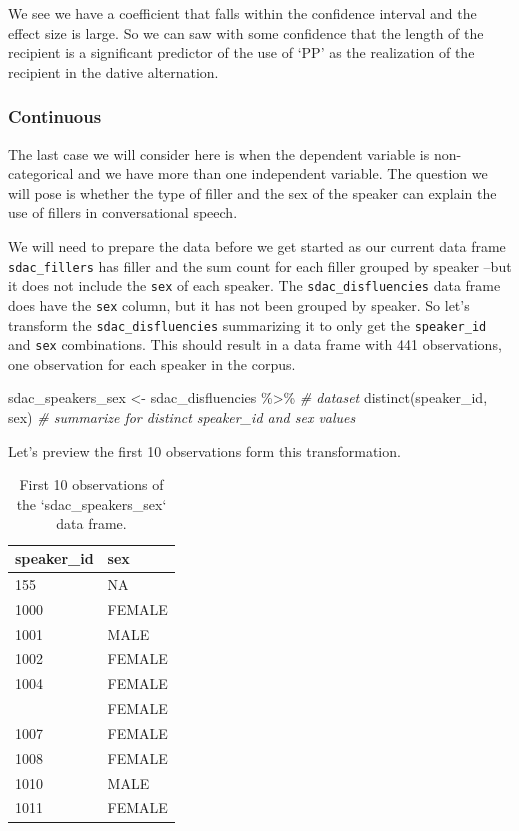 \documentclass[
]{article}
\newenvironment{Shaded}{\begin{snugshade}}{\end{snugshade}}
\newcommand{\CommentTok}[1]{\textcolor[rgb]{0.56,0.35,0.01}{\textit{#1}}}
\newcommand{\FunctionTok}[1]{\textcolor[rgb]{0.00,0.00,0.00}{#1}}
\newcommand{\NormalTok}[1]{#1}
\newcommand{\OtherTok}[1]{\textcolor[rgb]{0.56,0.35,0.01}{#1}}
\newcommand{\SpecialCharTok}[1]{\textcolor[rgb]{0.00,0.00,0.00}{#1}}
\begin{document}
We see we have a coefficient that falls within the confidence interval and the effect size is large. So we can saw with some confidence that the length of the recipient is a significant predictor of the use of `PP' as the realization of the recipient in the dative alternation.

\hypertarget{continuous-2}{%
\subsubsection{Continuous}\label{continuous-2}}

The last case we will consider here is when the dependent variable is non-categorical and we have more than one independent variable. The question we will pose is whether the type of filler and the sex of the speaker can explain the use of fillers in conversational speech.

We will need to prepare the data before we get started as our current data frame \texttt{sdac\_fillers} has filler and the sum count for each filler grouped by speaker --but it does not include the \texttt{sex} of each speaker. The \texttt{sdac\_disfluencies} data frame does have the \texttt{sex} column, but it has not been grouped by speaker. So let's transform the \texttt{sdac\_disfluencies} summarizing it to only get the \texttt{speaker\_id} and \texttt{sex} combinations. This should result in a data frame with 441 observations, one observation for each speaker in the corpus.

\begin{Shaded}
\begin{Highlighting}[]
\NormalTok{sdac\_speakers\_sex }\OtherTok{\textless{}{-}} 
\NormalTok{  sdac\_disfluencies }\SpecialCharTok{\%\textgreater{}\%} \CommentTok{\# dataset}
  \FunctionTok{distinct}\NormalTok{(speaker\_id, sex) }\CommentTok{\# summarize for distinct \textasciigrave{}speaker\_id\textasciigrave{} and \textasciigrave{}sex\textasciigrave{} values}
\end{Highlighting}
\end{Shaded}

Let's preview the first 10 observations form this transformation.

\begin{table}

\caption{\label{tab:i-multi-cont-transform-sdac-preview}First 10 observations of the `sdac_speakers_sex` data frame.}
\centering
\begin{tabular}[t]{ll}
\toprule
speaker\_id & sex\\
\midrule
155 & NA\\
1000 & FEMALE\\
1001 & MALE\\
1002 & FEMALE\\
1004 & FEMALE\\
\addlinespace
1005 & FEMALE\\
1007 & FEMALE\\
1008 & FEMALE\\
1010 & MALE\\
1011 & FEMALE\\
\bottomrule
\end{tabular}
\end{table}
\end{document}
